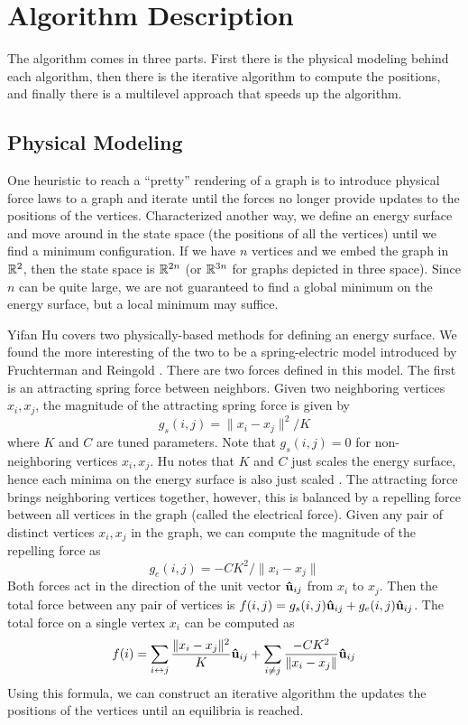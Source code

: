 \section{Algorithm Description}

The algorithm comes in three parts.
First there is the physical modeling behind each algorithm, then there is the iterative algorithm to compute the positions, and finally there is a multilevel approach that speeds up the algorithm.

\subsection{Physical Modeling}


One heuristic to reach a ``pretty'' rendering of a graph is to introduce physical force laws to a graph and iterate until the forces no longer provide updates to the positions of the vertices.
Characterized another way, we define an energy surface and move around in the state space (the positions of all the vertices) until we find a minimum configuration.
If we have $n$ vertices and we embed the graph in ${\mathbb R} ^2$, then the state space is ${\mathbb R} ^{2n}$ (or ${\mathbb R} ^{3n}$ for graphs depicted in three space).
Since $n$ can be quite large, we are not guaranteed to find a global minimum on the energy surface, but a local minimum may suffice.

Yifan Hu covers two physically-based methods for defining an energy surface.
We found the more interesting of the two to be a spring-electric model introduced by Fruchterman and Reingold \cite{fruchterman1991graph}.
There are two forces defined in this model.
The first is an attracting spring force between neighbors.
Given two neighboring vertices $x_i, x_j$, the magnitude of the attracting spring force is given by
$$ g_s (i,j) = \| x_i - x_j \|^2 / K $$
where $K$ and $C$ are tuned parameters.
Note that $g_s (i,j) = 0$ for non-neighboring vertices $x_i, x_j$.
Hu notes that $K$ and $C$ just scales the energy surface, hence each minima on the energy surface is also just scaled \cite{hu2005efficient}.
The attracting force brings neighboring vertices together, however, this is balanced by a repelling force between all vertices in the graph (called the electrical force).
Given any pair of distinct vertices $x_i, x_j$ in the graph, we can compute the magnitude of the repelling force as
$$ g_e (i,j) = -C K^2 / \| x_i - x_j \| $$
Both forces act in the direction of the unit vector $\boldsymbol{\hat{\textbf{u}}}_{ij}$ from $x_i$ to $x_j$.
Then the total force between any pair of vertices is $f (i,j) = g_s(i,j) \boldsymbol{\hat{\textbf{u}}}_{ij} + g_e (i,j) \boldsymbol{\hat{\textbf{u}}}_{ij}$.
The total force on a single vertex $x_i$ can be computed as
$$ f(i) = \sum _{i \leftrightarrow j} \dfrac{\| x_i - x_j \|^2}{K} \boldsymbol{\hat{\textbf{u}}}_{ij} + \sum _{i \neq j} \dfrac{-CK^2}{\| x_i - x_j \|} \boldsymbol{\hat{\textbf{u}}}_{ij} $$
Using this formula, we can construct an iterative algorithm the updates the positions of the vertices until an equilibria is reached.

